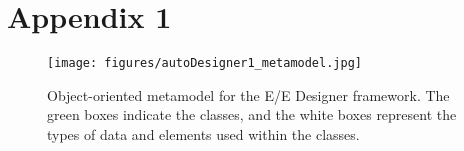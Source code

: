 \chapter{Appendix 1}%
%
%

      \begin{sidewaysfigure}
      \centering
      \texttt{[image: figures/autoDesigner1\_metamodel.jpg]}
      \caption{Object-oriented metamodel for the E/E Designer framework. The green boxes indicate the classes, and the white boxes represent the types of data and elements used within the classes.}
      \label{fig:metamodel}
      \end{sidewaysfigure}

    \begin{comment}
        

\end{comment}
